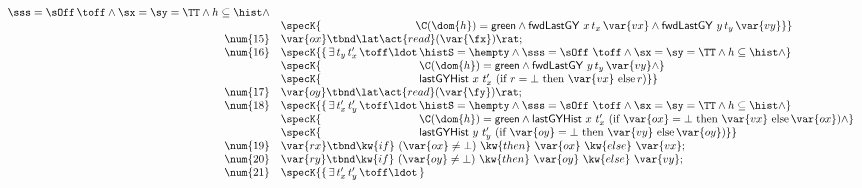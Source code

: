 \begin{figure}[!htp]
\[\begin{array}[t]{r l}
{             \sss = \sOff\, \toff \wedge \sx = \sy = \TT  \wedge
             h \subseteq \hist \wedge}\\
           & \specK{\hphantom{\{ \exists\, t_x \, t_y\, \toff\ldot}
             \C(\dom{h}) = \mathsf{green} \wedge    
            \botLGY\ x\, t_x\, \var{vx} \wedge \botLGY\ y\, t_y\, \var{vy}\}} \\
  \num{15} & \var{ox} \tbnd \lat \act{read}(\var{\fx}) \rat;\\
  \num{16} & \specK{\{\, \exists\, t_y\, t'_x\, \toff \ldot\,
              \histS = \hempty \wedge
              \sss = \sOff\ \toff \wedge \sx = \sy = \TT \wedge
              h \subseteq \hist \wedge}\\
           & \specK{\hphantom{\{\, \exists\, t_y\, t'_x\, \toff \ldot}\,
              \C(\dom{h}) = \mathsf{green} \wedge
              \botLGY\ y\, t_y\, \var{vy} \wedge}\\
           & \specK{\hphantom{\{\, \exists\, t_y\, t'_x\, \toff \ldot}\,
              \histLGY\ x\ t'_x\ (\textrm{if}\ r = \bot\
                   \textrm{then}\ \var{vx}\ \textrm{else}\, r)\}}\\
  \num{17} & \var{oy} \tbnd \lat \act{read}(\var{\fy}) \rat;\\
  \num{18} & \specK{\{\, \exists\, t'_x\, t'_y\, \toff \ldot\,
              \histS = \hempty \wedge
              \sss = \sOff\ \toff \wedge \sx = \sy = \TT \wedge
              h \subseteq \hist \wedge}\\
             & \specK{\hphantom{\{\,
                  \exists\, t'_x\, t'_y\, \toff \ldot}\,
              \C(\dom{h}) = \mathsf{green} \wedge
              \histLGY\ x\ t'_x\
                      (\textrm{if}\ \var{ox} = \bot\
                       \textrm{then}\ \var{vx}\
                       \textrm{else}\, \var{ox}) \wedge}\\
             & \specK{\hphantom{\{\,
                  \exists\, t'_x\, t'_y\, \toff \ldot}\,
                 \histLGY\ y\ t'_y\
                       (\textrm{if}\ \var{oy} = \bot\
                        \textrm{then}\ \var{vy}\ \textrm{else}\, \var{oy})\}}\\
  \num{19} & \var{rx} \tbnd \kw{if}\ (\var{ox} \neq\bot)\
                \kw{then}\ \var{ox}\ \kw{else}\ \var{vx};\\
  \num{20} & \var{ry} \tbnd \kw{if}\ (\var{oy} \neq\bot)\
                 \kw{then}\ \var{oy}\ \kw{else}\ \var{vy};\\
   \num{21} & \specK{\{\, \exists\, t'_x\, t'_y\, \toff \ldot\,
}
\end{array}\]
\end{figure}
